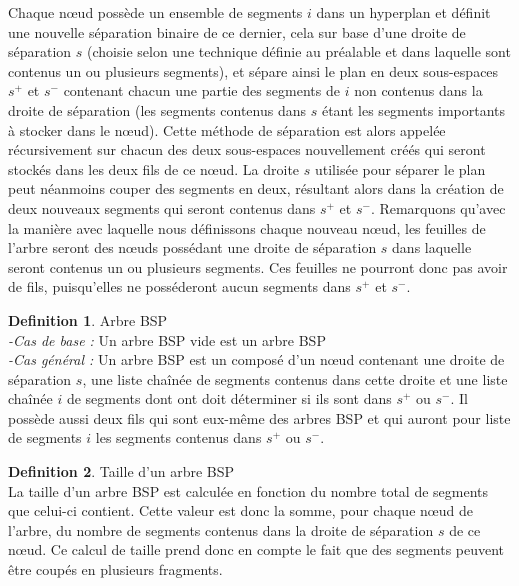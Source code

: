 \documentclass[11pt,a4paper]{article}
\theoremstyle{definition}
\newtheorem*{definition}{Definition}
\theoremstyle{remark}
\begin{document}
Chaque nœud possède un ensemble de segments $i$ dans un hyperplan et définit une nouvelle séparation binaire de ce dernier, cela sur base d'une droite de séparation $s$ (choisie selon une technique définie au préalable et dans laquelle sont contenus un ou plusieurs segments), et sépare ainsi le plan en deux sous-espaces $s^+$ et $s^-$ contenant chacun une partie des segments de $i$ non contenus dans la droite de séparation (les segments contenus dans $s$ étant les segments importants à stocker dans le nœud). Cette méthode de séparation est alors appelée récursivement sur chacun des deux sous-espaces nouvellement créés qui seront stockés dans les deux fils de ce nœud. La droite $s$ utilisée pour séparer le plan peut néanmoins couper des segments en deux, résultant alors dans la création de deux nouveaux segments qui seront contenus dans $s^+$ et $s^-$. Remarquons qu'avec la manière avec laquelle nous définissons chaque nouveau nœud, les feuilles de l'arbre seront des nœuds possédant une droite de séparation $s$ dans laquelle seront contenus un ou plusieurs segments. Ces feuilles ne pourront donc pas avoir de fils, puisqu'elles ne posséderont aucun segments dans $s^+$ et $s^-$.\\

\theoremstyle{Definition}
\begin{definition}{Arbre BSP}\\
\textit{-Cas de base :} Un arbre BSP vide est un arbre BSP\\
\textit{-Cas général :} Un arbre BSP est un composé d'un nœud contenant une droite de séparation $s$, une liste chaînée de segments contenus dans cette droite et une liste chaînée $i$ de segments dont ont doit déterminer si ils sont dans $s^+$ ou $s^-$. Il possède aussi deux fils qui sont eux-même des arbres BSP et qui auront pour liste de segments $i$ les segments contenus dans $s^+$ ou $s^-$.
\end{definition}

\theoremstyle{Definition}
\begin{definition}{Taille d'un arbre BSP}\\
La taille d'un arbre BSP est calculée en fonction du nombre total de segments que celui-ci contient. Cette valeur est donc la somme, pour chaque nœud de l'arbre, du nombre de segments contenus dans la droite de séparation $s$ de ce nœud. Ce calcul de taille prend donc en compte le fait que des segments peuvent être coupés en plusieurs fragments.\\
\end{definition}
\end{document}

